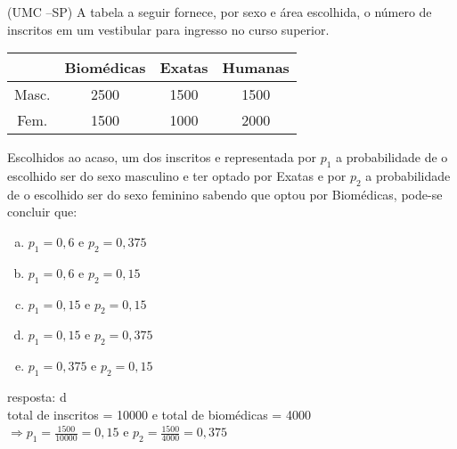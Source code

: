 \begin{ex}
(UMC –SP) A tabela a seguir fornece, por sexo e área escolhida, o número de inscritos em um vestibular para ingresso no curso superior.
\begin{center}
\begin{tabular}{|c|c|c|c|} \hline
& Biomédicas & Exatas & Humanas \\  \hline 
Masc.  & 2500 & 1500 & 1500  \\  \hline
Fem.   & 1500 & 1000 & 2000  \\ \hline
\end{tabular}
\end{center}

Escolhidos ao acaso, um dos inscritos  e representada por $p_1$ a probabilidade de o escolhido ser do sexo masculino e ter optado por Exatas e por $p_2$ a probabilidade de o escolhido ser do sexo feminino sabendo que optou por Biomédicas, pode-se concluir que:
   \begin{enumerate}[(a)]
   \item $p_1=0,6$ e $p_2=0,375$
   \item $p_1=0,6$ e $p_2=0,15$
   \item $p_1=0,15$ e $p_2=0,15$
   \item $p_1=0,15$ e $p_2=0,375$
   \item $p_1=0,375$ e $p_2=0,15$
   \end{enumerate}
    \begin{sol}
      resposta: d \\
      total de inscritos = 10000 \hspace{0,3cm}e \hspace{0,3cm}total de biomédicas = 4000 \\
      $\Longrightarrow p_1=\frac{1500}{10000}=0,15$ \hspace{0,3cm}e \hspace{0,3cm}$p_2=\frac{1500}{4000}=0,375$
    \end{sol}
\end{ex}